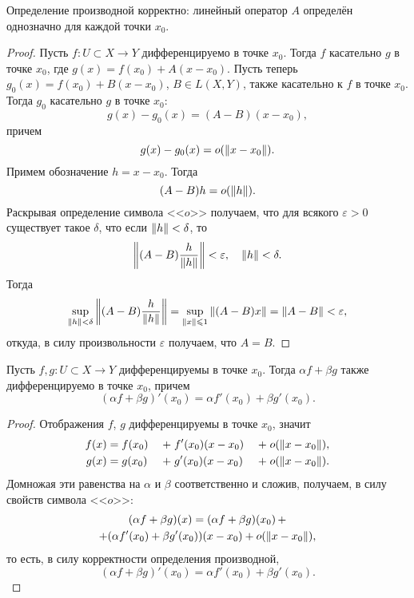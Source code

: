 \begin{theorem}
    Определение производной корректно: линейный оператор $A$ определён однозначно 
    для каждой точки $x_0$.
\end{theorem}

\begin{proof}
    Пусть $f \colon U \subset X \to Y$ дифференцируемо в точке $x_0$. Тогда
    $f$ касательно $g$ в точке $x_0$, где $g(x) = f(x_0) + A(x - x_0)$.
    Пусть теперь $g_0(x) = f(x_0) + B(x-x_0)$, $B \in L(X, Y)$,
     также касательно к $f$ в точке $x_0$.
    Тогда $g_0$ касательно $g$ в точке $x_0$:
    \[ g(x) - g_0(x) = (A-B)(x - x_0), \]
    причем
    \[ g(x) - g_0(x) = o(\left\|x - x_0\right\|). \]
    Примем обозначение $h = x - x_0$. Тогда
    \[ (A - B)h = o(\left\|h\right\|). \]
    Раскрывая определение символа <<$o$>> получаем, что для всякого $\varepsilon > 0$
    существует такое $\delta$, что если $\left\|h\right\| < \delta$, то 
    \[ \left\|(A-B)\frac{h}{\left\|h\right\|}\right\| < \varepsilon, \quad \left\|h\right\| < \delta. \]
    Тогда
    \[ \sup_{\left\|h\right\| < \delta} \left\|(A-B)\frac{h}{\left\|h\right\|}\right\| 
        = \sup_{\left\|x\right\| \leqslant 1} \left\|(A-B)x\right\| = \left\|A-B\right\| < \varepsilon, \]
    откуда, в силу произвольности $\varepsilon$ получаем, что $A = B$.
\end{proof}

\begin{theorem}
    Пусть $f, g \colon U \subset X \to Y$ дифференцируемы в точке $x_0$. Тогда
    $\alpha f + \beta g$ также дифференцируемо в точке $x_0$, причем
    \[ (\alpha f + \beta g)'(x_0) = \alpha f'(x_0) + \beta g'(x_0). \]
\end{theorem}

\begin{proof}
    Отображения $f$, $g$ дифференцируемы в точке $x_0$, значит
    \begin{alignat*}{6}
        f(x) &= f(x_0) \; &+& \; f'(x_0)(x - x_0) \; &+& \; o(\left\|x-x_0\right\|), \\
        g(x) &= g(x_0) \; &+& \; g'(x_0)(x - x_0) \; &+& \; o(\left\|x-x_0\right\|).
    \end{alignat*}
    Домножая эти равенства на $\alpha$ и $\beta$ соответственно и сложив, получаем, в силу
    свойств символа <<$o$>>:
    \begin{multline*}
        (\alpha f + \beta g)(x) = (\alpha f + \beta g)(x_0) \, + \\ +
            (\alpha f'(x_0) + \beta g'(x_0))(x - x_0) + o(\left\|x-x_0\right\|),
    \end{multline*}
    то есть, в силу корректности определения производной,
    \[ (\alpha f + \beta g)'(x_0) = \alpha f'(x_0) + \beta g'(x_0). \]
\end{proof}

